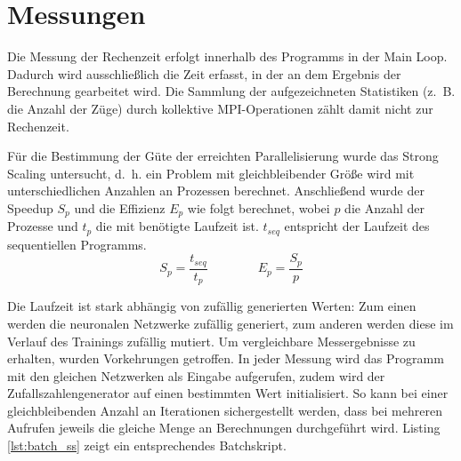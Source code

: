 \section{Messungen}

Die Messung der Rechenzeit erfolgt innerhalb des Programms in der Main Loop.
Dadurch wird ausschließlich die Zeit erfasst, in der an dem Ergebnis der
Berechnung gearbeitet wird.  Die Sammlung der aufgezeichneten Statistiken
(z.~B. die Anzahl der Züge) durch kollektive MPI-Operationen zählt damit nicht
zur Rechenzeit.

Für die Bestimmung der Güte der erreichten Parallelisierung wurde das Strong
Scaling untersucht, d.~h. ein Problem mit gleichbleibender Größe wird mit
unterschiedlichen Anzahlen an Prozessen berechnet. Anschließend wurde der
Speedup $S_p$ und die Effizienz  $E_p$ wie folgt berechnet, wobei $p$ die
Anzahl der Prozesse und $t_p$ die mit benötigte Laufzeit ist. $t_{seq}$
entspricht der Laufzeit des sequentiellen Programms.
\begin{equation*}
    S_p = \frac{t_{seq}}{t_p} \qquad\qquad E_p = \frac{S_p}{p}
\end{equation*}

Die Laufzeit ist stark abhängig von zufällig generierten Werten: Zum einen
werden die neuronalen Netzwerke zufällig generiert, zum anderen werden diese im
Verlauf des Trainings zufällig mutiert.  Um vergleichbare Messergebnisse zu
erhalten, wurden Vorkehrungen getroffen.  In jeder Messung wird das Programm
mit den gleichen Netzwerken als Eingabe aufgerufen, zudem wird der
Zufallszahlengenerator auf einen bestimmten Wert initialisiert. So kann bei
einer gleichbleibenden Anzahl an Iterationen sichergestellt werden, dass bei
mehreren Aufrufen jeweils die gleiche Menge an Berechnungen durchgeführt wird.
Listing \ref{lst:batch_ss} zeigt ein entsprechendes Batchskript.


